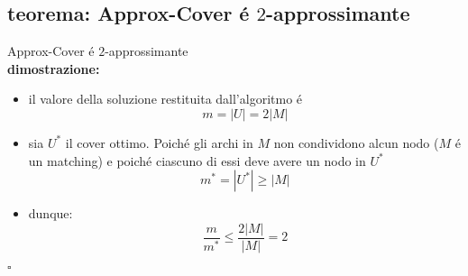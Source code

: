 
\subsection*{teorema: Approx-Cover \'e $2$-approssimante}
\begin{flushleft}
	Approx-Cover \'e $2$-approssimante \newline \\
	\textbf{dimostrazione:}
	\begin{itemize}
		\item il valore della soluzione restituita dall'algoritmo \'e $$m=|U|=2|M|$$
		\item sia $U^*$ il cover ottimo. \newline
			Poich\'e gli archi in $M$ non condividono alcun nodo ($M$ \'e un matching) e poich\'e ciascuno di essi deve avere un nodo in $U^*$
			$$m^*=|U^*|\geq|M|$$
		\item dunque: $$\frac{m}{m^*}\leq\frac{2|M|}{|M|}=2$$
	\end{itemize}
	\hfill$\square$
\end{flushleft}


\newpage
